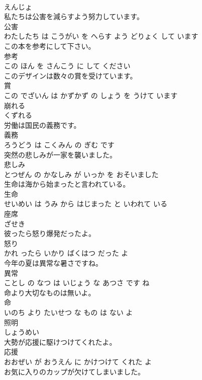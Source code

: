 \documentclass[8pt]{extreport}
\begin{document}
\begin{CJK}{UTF8}{min}
\\	えんじょ		
\\	私たちは公害を減らすよう努力しています。	
\\	公害 
\\	わたしたち は こうがい を へらす よう どりょく して います			
\\	この本を参考にして下さい。	
\\	参考 
\\	この ほん を さんこう に して ください			
\\	このデザインは数々の賞を受けています。	
\\	賞 
\\	この でざいん は かずかず の しょう を うけて います			
\\	崩れる	
\\	くずれる		
\\	労働は国民の義務です。	
\\	義務 
\\	ろうどう は こくみん の ぎむ です			
\\	突然の悲しみが一家を襲いました。	
\\	悲しみ 
\\	とつぜん の かなしみ が いっか を おそいました			
\\	生命は海から始まったと言われている。	
\\	生命 
\\	せいめい は うみ から はじまった と いわれて いる			
\\	座席	
\\	ざせき		
\\	彼ったら怒り爆発だったよ。	
\\	怒り 
\\	かれ ったら いかり ばくはつ だった よ			
\\	今年の夏は異常な暑さですね。	
\\	異常 
\\	ことし の なつ は いじょう な あつさ です ね			
\\	命より大切なものは無いよ。	
\\	命 
\\	いのち より たいせつ な もの は ない よ			
\\	照明	
\\	しょうめい		
\\	大勢が応援に駆けつけてくれたよ。	
\\	応援 
\\	おおぜい が おうえん に かけつけて くれた よ			
\\	お気に入りのカップが欠けてしまいました。	

\end{CJK}
\end{document}
